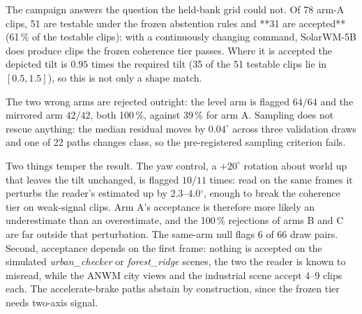 The campaign answers the question the held-bank grid could not.  Of 78 arm-A clips, 51 are
testable under the frozen abstention rules and **31 are accepted** (61\,\% of the testable
clips): with a continuously changing command, SolarWM-5B does produce clips the frozen
coherence tier passes.  Where it is accepted the depicted tilt is $0.95$ times the required
tilt (35 of the 51 testable clips lie in $[0.5, 1.5]$), so this is not only a shape match.

The two wrong arms are rejected outright: the level arm is flagged $64/64$ and the mirrored
arm $42/42$, both 100\,\%, against 39\,\% for arm A.  Sampling does not rescue anything: the
median residual moves by $0.04^\circ$ across three validation draws and one of 22 paths
changes class, so the pre-registered sampling criterion fails.

Two things temper the result.  The yaw control, a $+20^\circ$ rotation about world up that
leaves the tilt unchanged, is flagged $10/11$ times: read on the same frames it perturbs the
reader's estimated up by 2.3--4.0$^\circ$, enough to break the coherence tier on weak-signal
clips.  Arm A's acceptance is therefore more likely an underestimate than an overestimate, and
the 100\,\% rejections of arms B and C are far outside that perturbation.  The same-arm null
flags 6 of 66 draw pairs.  Second, acceptance depends on the first frame: nothing is accepted
on the simulated \emph{urban\_checker} or \emph{forest\_ridge} scenes, the two the reader is
known to misread, while the ANWM city views and the industrial scene accept 4--9 clips each.
The accelerate-brake paths abstain by construction, since the frozen tier needs two-axis
signal.

